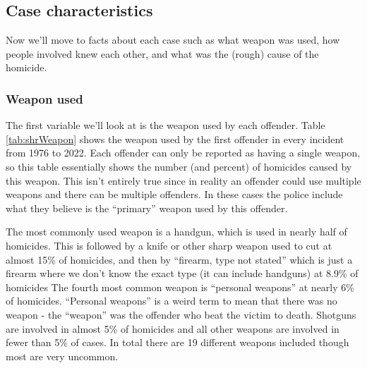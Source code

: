 \documentclass[
]{krantz}
\begin{document}
\subsection{Case
characteristics}\label{case-characteristics}

Now we'll move to facts about each case such as what weapon
was used, how people involved knew each other, and what was
the (rough) cause of the homicide.

\subsubsection{Weapon used}\label{weapon-used}

The first variable we'll look at is the weapon used by each
offender. Table \ref{tab:shrWeapon} shows the weapon used by
the first offender in every incident from 1976 to 2022. Each
offender can only be reported as having a single weapon, so
this table essentially shows the number (and percent) of
homicides caused by this weapon. This isn't entirely true
since in reality an offender could use multiple weapons and
there can be multiple offenders. In these cases the police
include what they believe is the ``primary'' weapon used by
this offender.

The most commonly used weapon is a handgun, which is used in
nearly half of homicides. This is followed by a knife or
other sharp weapon used to cut at almost 15\% of homicides,
and then by ``firearm, type not stated'' which is just a
firearm where we don't know the exact type (it can include
handguns) at 8.9\% of homicides The fourth most common
weapon is ``personal weapons'' at nearly 6\% of homicides.
``Personal weapons'' is a weird term to mean that there was
no weapon - the ``weapon'' was the offender who beat the
victim to death. Shotguns are involved in almost 5\% of
homicides and all other weapons are involved in fewer than
5\% of cases. In total there are 19 different weapons
included though most are very uncommon.
\end{document}
